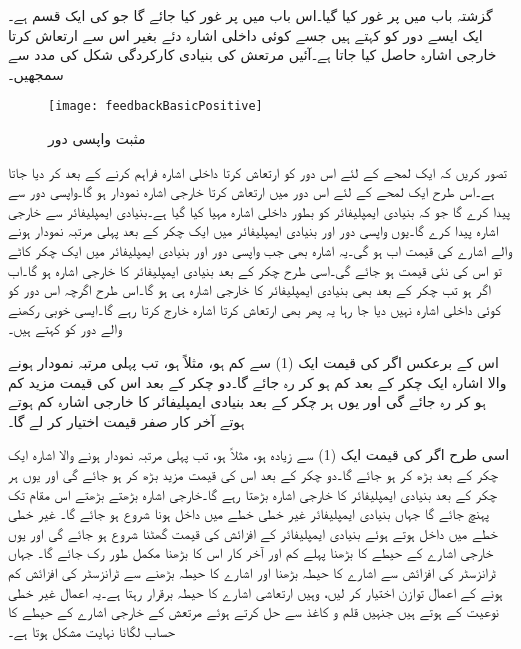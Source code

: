  
گزشتہ باب میں  پر غور کیا گیا۔اس باب میں  پر غور کیا جائے گا جو  کی ایک قسم ہے۔ ایک ایسے دور کو کہتے ہیں جسے کوئی داخلی اشارہ دئے بغیر اس سے ارتعاش کرتا خارجی اشارہ حاصل کیا جاتا ہے۔آئیں مرتعش کی بنیادی کارکردگی شکل  کی مدد سے سمجھیں۔ 
\begin{figure}
\centering
\texttt{[image: feedbackBasicPositive]}
\caption{مثبت واپسی دور}
\label{شکل_بنیادی_مثبت_واپسی_دور}
\end{figure}
تصور کریں کہ ایک لمحے کے لئے اس دور کو ارتعاش کرتا داخلی اشارہ  فراہم کرنے کے بعد  کر دیا جاتا ہے۔اس طرح ایک لمحے کے لئے اس دور میں  ارتعاش کرتا خارجی اشارہ  نمودار ہو  گا۔واپسی دور  سے  پیدا کرے گا جو کہ بنیادی ایمپلیفائر کو بطور داخلی اشارہ مہیا کیا گیا ہے۔بنیادی ایمپلیفائر  سے خارجی اشارہ  پیدا کرے گا۔یوں واپسی دور اور بنیادی ایمپلیفائر میں ایک چکر کے بعد پہلی مرتبہ نمودار ہونے والے اشارے  کی قیمت اب  ہو گی۔یہ اشارہ بھی جب واپسی دور اور بنیادی ایمپلیفائر میں ایک چکر کاٹے تو اس کی نئی قیمت  ہو جائے گی۔اسی طرح  چکر کے بعد بنیادی ایمپلیفائر کا خارجی اشارہ  ہو گا۔اب اگر  ہو تب  چکر کے بعد بھی بنیادی ایمپلیفائر کا خارجی اشارہ  ہی ہو گا۔اس طرح اگرچہ اس دور کو کوئی داخلی اشارہ نہیں دیا جا رہا یہ پھر بھی ارتعاش کرتا اشارہ  خارج کرتا رہے گا۔ایسی خوبی رکھنے والے دور کو   کہتے ہیں۔

اس کے برعکس اگر  کی قیمت ایک (1) سے کم ہو، مثلاً  ہو، تب پہلی مرتبہ نمودار ہونے والا اشارہ  ایک چکر کے بعد کم ہو کر  رہ جائے گا۔دو چکر کے بعد اس کی قیمت مزید کم ہو کر  رہ جائے گی اور یوں ہر چکر کے بعد بنیادی ایمپلیفائر کا خارجی اشارہ کم ہوتے ہوتے آخر کار صفر قیمت اختیار کر لے گا۔

اسی طرح  اگر   کی قیمت ایک (1) سے زیادہ ہو، مثلاً  ہو، تب پہلی مرتبہ نمودار ہونے والا اشارہ  ایک چکر کے بعد بڑھ کر  ہو جائے گا۔دو چکر کے بعد اس کی قیمت مزید بڑھ کر  ہو جائے گی اور یوں ہر چکر کے بعد بنیادی ایمپلیفائر کا خارجی اشارہ بڑھتا رہے گا۔خارجی اشارہ بڑھتے بڑھتے اس مقام تک پہنچ جائے گا جہاں بنیادی ایمپلیفائر غیر خطی خطے میں داخل ہونا شروع ہو جائے گا۔ غیر خطی خطے میں داخل ہوتے ہوئے بنیادی ایمپلیفائر کے افزائش کی قیمت گھٹنا شروع ہو جائے گی اور یوں خارجی اشارے کے حیطے کا بڑھنا پہلے کم اور آخر کار اس کا بڑھنا مکمل طور   رک  جائے  گا۔ جہاں ٹرانزسٹر کی افزائش سے اشارے کا حیطہ بڑھنا اور اشارے کا حیطہ بڑھنے سے ٹرانزسٹر کی افزائش کم ہونے کے اعمال توازن اختیار کر لیں، وہیں ارتعاشی اشارے کا حیطہ برقرار رہتا ہے۔یہ اعمال غیر خطی نوعیت کے ہوتے ہیں جنہیں قلم و کاغذ سے حل کرتے ہوئے مرتعش کے خارجی اشارے کے حیطے کا حساب لگانا نہایت مشکل ہوتا ہے۔

